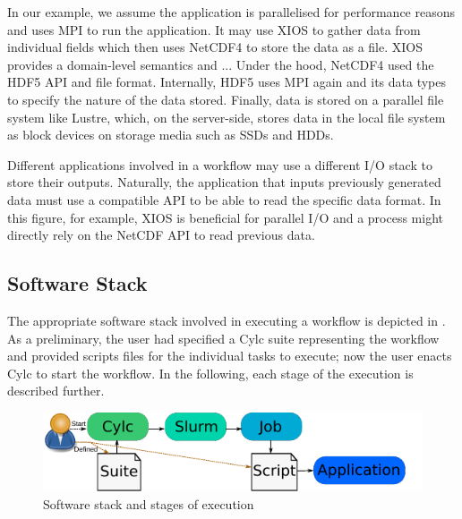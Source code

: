 \documentclass[a4paper]{article}
\newcommand{\jk}[1]{\todo[inline]{JK: #1}}
\begin{document}
\begin{minipage}{0.7\textwidth}
In our example, we assume the application is parallelised for performance reasons and uses MPI to run the application.
It may use XIOS to gather data from individual fields which then uses NetCDF4 to store the data as a file.
XIOS provides a domain-level semantics and ...\jk{TODO}
Under the hood, NetCDF4 used the HDF5 API and file format.
Internally, HDF5 uses MPI again and its data types to specify the nature of the data stored.
Finally, data is stored on a parallel file system like Lustre, which, on the server-side, stores data in the local file system as block devices on storage media such as SSDs and HDDs.

Different applications involved in a workflow may use a different I/O stack to store their outputs.
Naturally, the application that inputs previously generated data must use a compatible API to be able to read the specific data format.
In this figure, for example, XIOS is beneficial for parallel I/O and a process might directly rely on the NetCDF API to read previous data.
\end{minipage}



\subsection{Software Stack}

The appropriate software stack involved in executing a workflow is depicted in .
As a preliminary, the user had specified a Cylc suite representing the workflow and provided scripts files for the individual tasks to execute; now the user enacts Cylc to start the workflow.
In the following, each stage of the execution is described further.

\begin{figure}[H]
  \centering
  \includegraphics[scale=1.4]{stages}
  \caption{Software stack and stages of execution}
  \label{fig:stages}
\end{figure}
\end{document}
